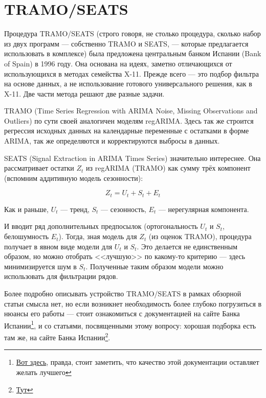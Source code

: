 \documentclass[final,pdftex]{../../template/epsilonj}\usepackage[]{graphicx}\usepackage[]{color}
\begin{document}
\section{TRAMO/SEATS} 

Процедура TRAMO/SEATS (строго говоря, не столько процедура, сколько набор из двух программ --- собственно TRAMO и SEATS, --- которые предлагается использовать в комплексе) была предложена центральным банком Испании (Bank of Spain) в 1996 году. Она основана на идеях, заметно отличающихся от использующихся в методах семейства X-11. Прежде всего --- это подбор фильтра на основе данных, а не использование готового универсального решения, как в X-11. Две части метода решают две разные задачи. 

TRAMO (Time Series Regression with ARIMA Noise, Missing Observations and Outliers) по сути своей аналогичен моделям regARIMA. Здесь так же строится регрессия исходных данных на календарные переменные с остатками в форме ARIMA, так же определяются и корректируются выбросы в данных. 

SEATS (Signal Extraction in ARIMA Times Series) значительно интереснее. Она рассматривает остатки $Z_t$ из regARIMA (TRAMO) как сумму трёх компонент (вспомним аддитивную модель сезонности):

\[
Z_t = U_t + S_t + E_t
\]

Как и раньше, $U_t$ --- тренд, $S_t$ --- сезонность, $E_t$ --- нерегулярная компонента.

И вводит ряд дополнительных предпосылок (ортогональность $U_t$ и $S_t$, белошумность $E_t$). Тогда, зная модель для $Z_t$ (из оценок TRAMO), процедура получает в явном виде модели для $U_t$ и $S_t$. Это делается не единственным образом, но можно отобрать <<лучшую>> по какому-то критерию --- здесь минимизируется шум в $S_t$. Полученные таким образом модели можно использовать для фильтрации рядов. 

Более подробно описывать устройство TRAMO/SEATS в рамках обзорной статьи смысла нет, но если возникнет необходимость более глубоко погрузиться в нюансы его работы --- стоит ознакомиться с документацией на сайте Банка Испании\footnote{\href{http://www.bde.es/bde/en/secciones/servicios/Profesionales/Programas_estadi/Notas_introduct_3638497004e2e21.html}{Вот здесь}, правда, стоит заметить, что качество этой документации оставляет желать лучшего}, и со статьями, посвященными этому вопросу: хорошая подборка есть там же, на сайте Банка Испании\footnote{\href{http://www.bde.es/bde/en/secciones/servicios/Profesionales/Programas_estadi/Trabajos_sobre__0ac07f3710fd821.html}{Тут}}. 
\end{document}
